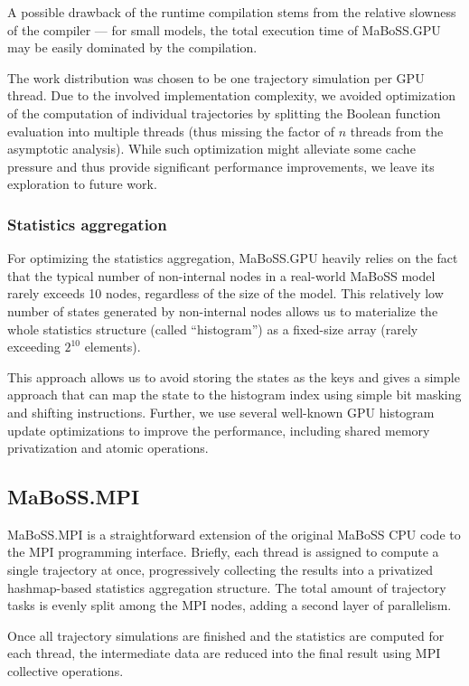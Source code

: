 \documentclass[sn-mathphys-num]{sn-jnl}%
\begin{document}
A possible drawback of the runtime compilation stems from the relative slowness of the compiler --- for small models, the total execution time of MaBoSS.GPU may be easily dominated by the compilation.

The work distribution was chosen to be one trajectory simulation per GPU thread. Due to the involved implementation complexity, we avoided optimization of the computation of individual trajectories by splitting the Boolean function evaluation into multiple threads (thus missing the factor of $n$ threads from the asymptotic analysis). While such optimization might alleviate some cache pressure and thus provide significant performance improvements, we leave its exploration to future work.

\subsubsection*{Statistics aggregation}

For optimizing the statistics aggregation, MaBoSS.GPU heavily relies on the fact that the typical number of non-internal nodes in a real-world MaBoSS model rarely exceeds 10 nodes, regardless of the size of the model. This relatively low number of states generated by non-internal nodes allows us to materialize the whole statistics structure (called ``histogram'') as a fixed-size array (rarely exceeding $2^{10}$ elements).

This approach allows us to avoid storing the states as the keys and gives a simple approach that can map the state to the histogram index using simple bit masking and shifting instructions. Further, we use several well-known GPU histogram update optimizations to improve the performance, including shared memory privatization and atomic operations.

\subsection{MaBoSS.MPI}

MaBoSS.MPI is a straightforward extension of the original MaBoSS CPU code to the MPI programming interface.
Briefly, each thread is assigned to compute a single trajectory at once, progressively collecting the results into a privatized hashmap-based statistics aggregation structure. The total amount of trajectory tasks is evenly split among the MPI nodes, adding a second layer of parallelism.

Once all trajectory simulations are finished and the statistics are computed for each thread, the intermediate data are reduced into the final result using MPI collective operations.
\end{document}
